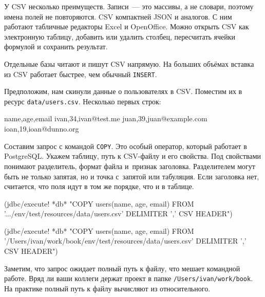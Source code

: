 У CSV несколько преимуществ. Записи~--- это массивы, а не словари, поэтому имена
полей не повторяются. CSV компактней JSON и аналогов. С ним работают табличные
редакторы Excel и OpenOffice. Можно открыть CSV как электронную таблицу,
добавить или удалить столбец, пересчитать ячейки формулой и сохранить результат.


Отдельные базы читают и пишут CSV напрямую. На больших объёмах вставка из CSV
работает быстрее, чем обычный \verb|INSERT|.

Предположим, нам скинули данные о пользователях в CSV. Поместим их в ресурс
\verb|data/users.csv|. Несколько первых строк:

\begin{english}
  \begin{text}
name,age,email
ivan,34,ivan@test.me
juan,39,juan@example.com
ioan,19,ioan@dunno.org
  \end{text}
\end{english}


Составим запрос с командой \verb|COPY|. Это особый оператор, который работает в
PostgreSQL. Укажем таблицу, путь к CSV-файлу и его свойства. Под свойствами
понимают разделитель, формат файла и~признак заголовка. Разделителем могут быть
не только запятая, но и точка с~запятой или табуляция. Если заголовка нет,
считается, что поля идут в том же порядке, что и в таблице.

\ifx\DEVICETYPE\MOBILE

\begin{english}
  \begin{clojure}
(jdbc/execute! *db*
 "COPY users(name, age, email)
  FROM
  '.../env/test/resources/data/users.csv'
  DELIMITER ',' CSV HEADER")
  \end{clojure}
\end{english}

\else

\begin{english}
  \begin{clojure}
(jdbc/execute! *db*
 "COPY users(name, age, email)
  FROM '/Users/ivan/work/book/env/test/resources/data/users.csv'
  DELIMITER ',' CSV HEADER")
  \end{clojure}
\end{english}

\fi

Заметим, что запрос ожидает полный путь к файлу, что мешает командной
работе. Вряд ли ваши коллеги держат проект в папке
\verb|/Users/ivan/work/book|. На практике полный путь к файлу вычисляют из
относительного.

